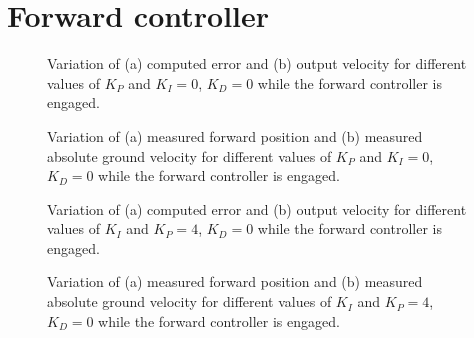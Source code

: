 \section{Forward controller}
\label{app:fwd-pid-results}

\begin{figure}[H]
    \begin{minipage}[t]{0.5\linewidth}
        \centering
        \scalebox{0.55}{}
    \end{minipage}
    \begin{minipage}[t]{0.5\linewidth}
        \centering
        \scalebox{0.55}{}
    \end{minipage}
    \caption{Variation of (a) computed error and (b) output velocity for different values of $K_{P}$ and $K_I=0$, $K_D=0$ while the forward controller is engaged.}
    \label{fig:tune-fwd-prop-io}
\end{figure}
\begin{figure}[H]
    \begin{minipage}[t]{0.5\linewidth}
        \centering
        \scalebox{0.55}{}
    \end{minipage}
    \begin{minipage}[t]{0.5\linewidth}
        \centering
        \scalebox{0.55}{}
    \end{minipage}
    \caption{Variation of (a) measured forward position and (b) measured absolute ground velocity for different values of $K_{P}$ and $K_I=0$, $K_D=0$ while the forward controller is engaged.}
    \label{fig:tune-fwd-prop-measures}
\end{figure}

\begin{figure}[H]
    \begin{minipage}[t]{0.5\linewidth}
        \centering
        \scalebox{0.55}{}
    \end{minipage}
    \begin{minipage}[t]{0.5\linewidth}
        \centering
        \scalebox{0.55}{}
    \end{minipage}
    \caption{Variation of (a) computed error and (b) output velocity for different values of $K_{I}$ and $K_P=4$, $K_D=0$ while the forward controller is engaged.}
    \label{fig:tune-fwd-int-io}
\end{figure}
\begin{figure}[H]
    \begin{minipage}[t]{0.5\linewidth}
        \centering
        \scalebox{0.55}{}
    \end{minipage}
    \begin{minipage}[t]{0.5\linewidth}
        \centering
        \scalebox{0.55}{}
    \end{minipage}
    \caption{Variation of (a) measured forward position and (b) measured absolute ground velocity for different values of $K_{I}$ and $K_P=4$, $K_D=0$ while the forward controller is engaged.}
    \label{fig:tune-fwd-int-measures}
\end{figure}

